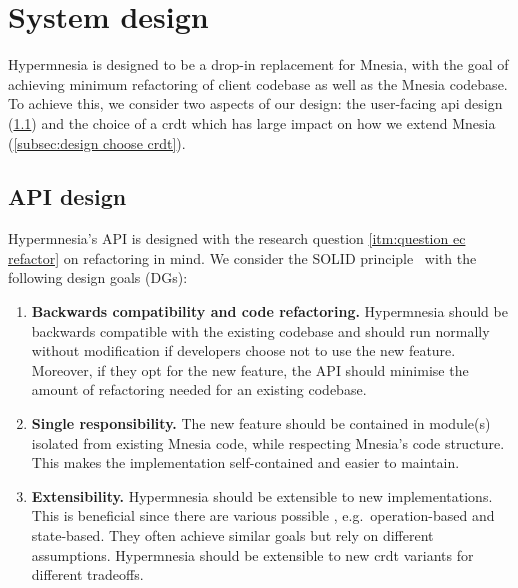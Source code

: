\section{System design} \label{sec:design}

Hypermnesia is designed to be a drop-in replacement for Mnesia, with the goal
of achieving minimum refactoring of client codebase as well as the Mnesia codebase.
To achieve this, we consider two aspects of our design: the user-facing 
\acrshort{api} design (\cref{subsec:design api}) and the choice of a 
\acrshort{crdt} which
has large impact on how we extend Mnesia (\cref{subsec:design choose crdt}).




\subsection{API design} \label{subsec:design api}

Hypermnesia's API is designed with the research question \cref{itm:question ec refactor}
on refactoring in mind. We consider the SOLID principle~\cite{martin2000solid}
with the following design goals (DGs):

\begin{enumerate}[label={DG\arabic*.},ref={DG\arabic*}]
  \item \textbf{Backwards compatibility and code refactoring.} Hypermnesia should be
  backwards compatible with the existing codebase and should run normally without
  modification if developers choose not to use the new feature. Moreover, if they opt
  for the new feature, the API should minimise the amount of refactoring 
  needed for an existing codebase. \label{itm:refactor}
  \item \textbf{Single responsibility.} The new feature should be contained in 
  module(s) isolated from existing Mnesia code, while respecting Mnesia's code structure.
  This makes the implementation self-contained and easier to maintain. \label{itm:single resp}
  \item \textbf{Extensibility.} Hypermnesia should be extensible to new 
  implementations. This is beneficial since there are various possible , 
  e.g.\ operation-based and state-based. They often achieve similar goals but rely 
  on different assumptions. Hypermnesia should be extensible to new \acrshort{crdt} 
  variants for different tradeoffs.
  \label{itm:extensible}
\end{enumerate}


